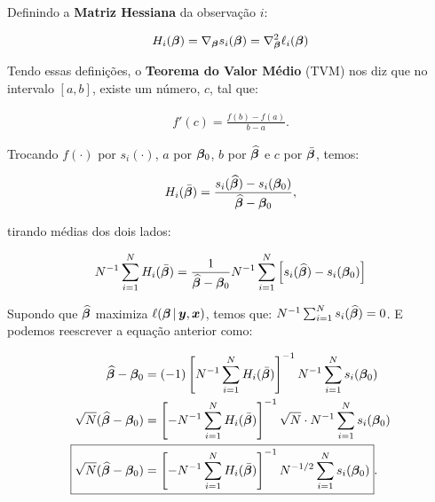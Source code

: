 \documentclass[11pt, oneside, a4paper, article]{article}
\numberwithin{equation}{section}
\begin{document}
\begin{description}
Definindo a \textbf{Matriz Hessiana} da observação $i$:

\vspace{-1 em}
\begin{align*}
H_{i} (\boldsymbol{\beta}) = 
\nabla_{\boldsymbol{\beta}} s_{i} (\boldsymbol{\beta}) = 
\nabla_{\boldsymbol{\beta}}^2 \ell_{i} (\boldsymbol{\beta})
\end{align*}

Tendo essas definições, o \textbf{Teorema do Valor Médio} (TVM) nos diz que no intervalo $[a, b]$, existe um número, $c$, tal que:

\vspace{-1 em}
\begin{align*}
	f'(c) = \frac{f(b) - f(a)}{b - a}.
\end{align*}

\vspace{1 em}
\begin{center}
\end{center}
\vspace{1 em}

Trocando 
$f(\cdot)$ por $s_{i}(\cdot)$, 
$a$ por $\boldsymbol{\beta}_{0}$, 
$b$ por $\widehat{\boldsymbol{\beta}}$ e
$c$ por $\bar{\boldsymbol{\beta}}$,
temos:

\vspace{-1 em}
\begin{align*}
H_{i} ( \bar{\boldsymbol{\beta}} ) =
\frac{s_{i}( \widehat{\boldsymbol{\beta}} ) - s_{i}( \boldsymbol{\beta}_{0} )}{\widehat{\boldsymbol{\beta}} - \boldsymbol{\beta}_{0}},
\end{align*}

\noindent
tirando médias dos dois lados:

\vspace{-1 em}
\begin{align*}
N^{-1} \sum_{i=1}^{N} 
H_{i} ( \bar{\boldsymbol{\beta}} ) 
=
\frac{1}{\widehat{\boldsymbol{\beta}} - \boldsymbol{\beta}_{0}}
N^{-1} \sum_{i=1}^{N} 
\left[ 
s_{i}( \widehat{\boldsymbol{\beta}} ) - s_{i}( \boldsymbol{\beta}_{0} )
\right]
\end{align*}

Supondo que
$\widehat{\boldsymbol{\beta}}$
maximiza
$\ell (\boldsymbol{\beta} \, | \, \boldsymbol{y}, \boldsymbol{x})$,
temos que:
$N^{-1} \sum_{i=1}^{N} s_{i}(\widehat{\boldsymbol{\beta}}) = 0$.
E podemos reescrever a equação anterior como:

\vspace{-1 em}
\begin{align*}
\widehat{\betavec} - \betavec_{0}
&=
(-1)
\left[ N^{-1} \sum_{i=1}^{N} H_{i} ( \bar{\betavec} ) \right]^{-1}
N^{-1} \sum_{i=1}^{N} s_{i}( \betavec_{0} ) 
\\
\sqrt{N} ( \widehat{\betavec} - \betavec_{0} )
&=
\left[
- N^{-1} \sum_{i=1}^{N} H_{i} ( \bar{\betavec} )
\right]^{-1}
\sqrt{N} \cdot N^{-1} \sum_{i=1}^{N} s_{i}( \betavec_{0} ) 
\\
\Aboxed{
\sqrt{N} ( \widehat{\betavec} - \betavec_{0} )
&=
\left[
- N^{-1} \sum_{i=1}^{N} H_{i} ( \bar{\betavec} )
\right]^{-1}
N^{-1/2} \sum_{i=1}^{N} s_{i}( \betavec_{0} ) }.
\end{align*}


\end{description}
\end{document}
